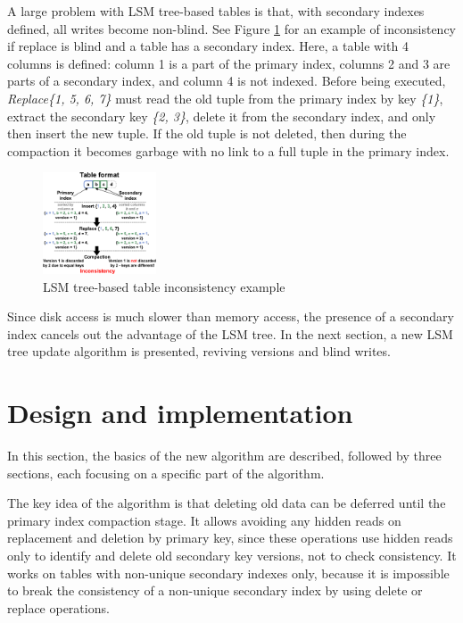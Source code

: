 \documentclass{vldb}
\begin{document}
A large problem with LSM tree-based tables is that, with secondary indexes defined,
all writes become non-blind. See Figure \ref{fig:inconsistent_example}
for an example of inconsistency if replace is blind and a table has a secondary
index. Here, a table with 4 columns is defined: column 1 is a part of the primary index,
columns 2 and 3 are parts of a secondary index, and column 4 is not indexed. Before being
executed, \textit{Replace\{1, 5, 6, 7\}} must read the old tuple from the
primary index by key \textit{\{1\}}, extract the secondary key
\textit{\{2, 3\}}, delete it from the secondary index, and only then insert the
new tuple. If the old tuple is not deleted, then during the compaction it becomes
garbage with no link to a full tuple in the primary index.
\begin{figure}
\centering
\includegraphics[width=0.3\textwidth]{inconsistent_example}
\caption{LSM tree-based table inconsistency example}
\label{fig:inconsistent_example}
\end{figure}

Since disk access is much slower than memory access, the presence of a secondary index
cancels out the advantage of the LSM tree. In the next section, a new LSM tree update
algorithm is presented, reviving versions and blind writes.

\section{Design and implementation}
In this section, the basics of the new algorithm are described, followed by three sections,
each focusing on a specific part of the algorithm.

The key idea of the algorithm is that deleting old data can be deferred until the
primary index compaction stage. It allows avoiding any hidden reads on replacement
and deletion by primary key, since these operations use hidden reads only to identify
and delete old secondary key versions, not to check consistency. It works on
tables with non-unique secondary indexes only, because it is impossible to break
the consistency of a non-unique secondary index by using delete or replace operations.
\end{document}
